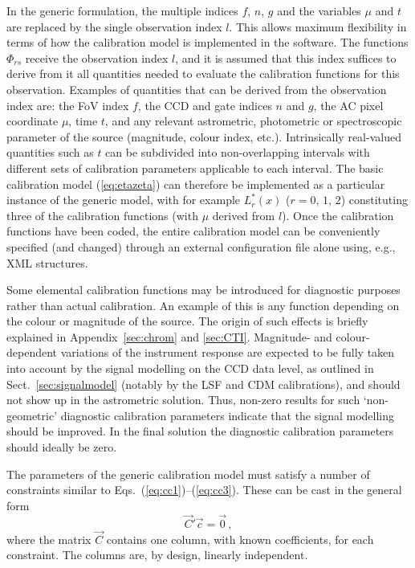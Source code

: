 \documentclass[structabstract]{aa}
\begin{document}
In the generic formulation, the multiple indices $f$, $n$, $g$ and the
variables $\mu$ and $t$ are replaced by the single observation index $l$.
This allows maximum flexibility in terms of how the calibration model is
implemented in the software. The functions $\Phi_{rs}$ receive the
observation index $l$, and it is assumed
that this index suffices to derive from it all quantities needed to evaluate
the calibration functions for this observation. Examples of quantities that
can be derived from the observation index are: the FoV index $f$, the CCD and
gate indices $n$ and $g$, the AC pixel coordinate $\mu$, time $t$, and any
relevant astrometric, photometric or spectroscopic parameter of the source
(magnitude, colour index, etc.). Intrinsically real-valued quantities such
as $t$ can be subdivided into non-overlapping intervals with different sets
of calibration parameters applicable to each interval. The basic calibration
model (\ref{eq:etazeta}) can therefore be implemented as a particular instance
of the generic model, with for example $L_r^\ast(x)$ ($r=0,\,1,\,2$)
constituting three of the calibration functions (with $\mu$ derived from $l$).
Once the calibration functions have been coded, the entire calibration model
can be conveniently specified (and changed) through an external configuration
file alone using, e.g., XML structures.

Some elemental calibration functions may be introduced for diagnostic 
purposes rather than actual calibration. An example of this is any function
depending on the colour or magnitude of the source. The origin of such 
effects is briefly explained in Appendix~\ref{sec:chrom} and \ref{sec:CTI}.
Magnitude- and 
colour-dependent variations of the instrument response are expected to be
fully taken into account by the signal modelling on the CCD data level,
as outlined in Sect.~\ref{sec:signalmodel} (notably by the LSF and CDM
calibrations), and should not show up in the astrometric solution. Thus,
non-zero results for such `non-geometric' diagnostic calibration parameters 
indicate that the signal modelling should be improved. In the final solution
the diagnostic calibration parameters should ideally be zero.

The parameters of the generic calibration model must satisfy a number of
constraints similar to Eqs.~(\ref{eq:cc1})--(\ref{eq:cc3}). These can be cast
in the general form
\begin{equation}\label{eq:genericConstraint}
\vec{C}'\vec{c} = \vec{0} \, ,
\end{equation}
where the matrix $\vec{C}$ contains one column, with known coefficients, 
for each constraint. The columns are, by design, linearly independent.
\end{document}
